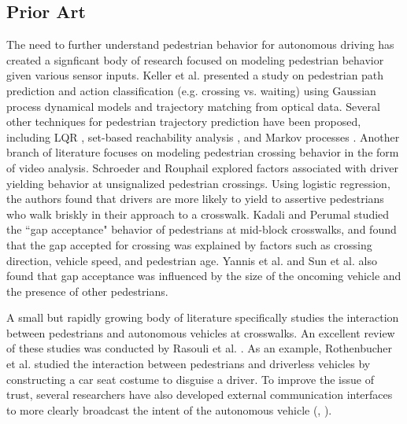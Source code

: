\documentclass[letterpaper, 10 pt, conference]{ieeeconf} %
\begin{document}
\subsection{Prior Art}

The need to further understand pedestrian behavior for autonomous driving has created a signficant body of research focused on modeling pedestrian behavior given various sensor inputs. Keller et al. \cite{Keller2014} presented a study on pedestrian path prediction and action classification (e.g. crossing vs. waiting) using Gaussian process dynamical models and trajectory matching from optical data. Several other techniques for pedestrian trajectory prediction have been proposed, including LQR \cite{batkovic2018computationally}, set-based reachability analysis \cite{Koschi2018}, and Markov processes \cite{Karasev2016}. Another branch of literature focuses on modeling pedestrian crossing behavior in the form of video analysis. Schroeder and Rouphail \cite{Schroeder2011} explored factors associated with driver yielding behavior at unsignalized pedestrian crossings. Using logistic regression, the authors found that drivers are more likely to yield to assertive pedestrians who walk briskly in their approach to a crosswalk. Kadali and Perumal \cite{RaghuramKadali2012} studied the ``gap acceptance" behavior of pedestrians at mid-block crosswalks, and found that the gap accepted for crossing was explained by factors such as crossing direction, vehicle speed, and pedestrian age. Yannis et al. \cite{Yannis2013} and Sun et al.\cite{Sun2002} also found that gap acceptance was influenced by the size of the oncoming vehicle and the presence of other pedestrians. 

A small but rapidly growing body of literature specifically studies the interaction between pedestrians and autonomous vehicles at crosswalks. An excellent review of these studies was conducted by Rasouli et al. \cite{Rasouli}. As an example, Rothenbucher et al. \cite{Rothenbucher2016} studied the interaction between pedestrians and driverless vehicles by constructing a car seat costume to disguise a driver. To improve the issue of trust, several researchers have also developed external communication interfaces to more clearly broadcast the intent of the autonomous vehicle (\cite{Matthews}, \cite{Lagstrom2015}). 
\end{document}

